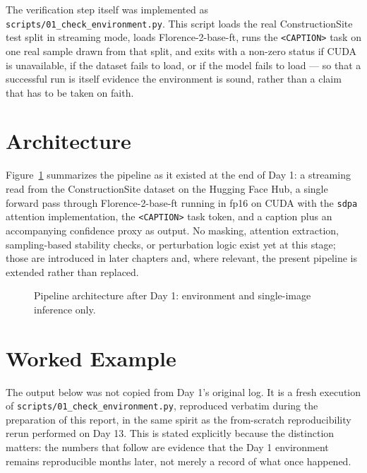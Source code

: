 The verification step itself was implemented as \texttt{scripts/01\_check\_environment.py}. This
script loads the real ConstructionSite test split in streaming mode, loads
Florence-2-base-ft, runs the \texttt{<CAPTION>} task on one real sample drawn from that split, and
exits with a non-zero status if CUDA is unavailable, if the dataset fails to load, or if the model
fails to load --- so that a successful run is itself evidence the environment is sound, rather than
a claim that has to be taken on faith.

\section{Architecture}

Figure~\ref{fig:diagram-a} summarizes the pipeline as it existed at the end of Day 1: a streaming
read from the ConstructionSite dataset on the Hugging Face Hub, a single forward pass through
Florence-2-base-ft running in fp16 on CUDA with the \texttt{sdpa} attention implementation, the
\texttt{<CAPTION>} task token, and a caption plus an accompanying confidence proxy as output. No
masking, attention extraction, sampling-based stability checks, or perturbation logic exist yet at
this stage; those are introduced in later chapters and, where relevant, the present pipeline is
extended rather than replaced.

\begin{figure}[h]
\centering
{}
\caption{Pipeline architecture after Day 1: environment and single-image inference only.}
\label{fig:diagram-a}
\end{figure}

\section{Worked Example}

The output below was not copied from Day 1's original log. It is a fresh execution of
\texttt{scripts/01\_check\_environment.py}, reproduced verbatim during the preparation of this
report, in the same spirit as the from-scratch reproducibility rerun performed on Day 13. This is
stated explicitly because the distinction matters: the numbers that follow are evidence that the
Day 1 environment remains reproducible months later, not merely a record of what once happened.

